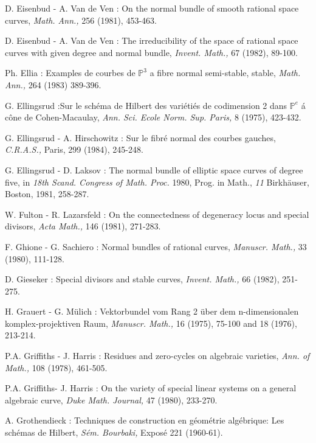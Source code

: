 \begin{thebibliography}{}
 D. Eisenbud - A. Van de Ven : On the normal bundle of smooth rational space curves, {\em Math. Ann.,} 256 (1981), 453-463.

 D. Eisenbud - A. Van de Ven : The irreducibility of the space of rational space curves with given degree and normal bundle, {\em Invent. Math.,} 67 (1982), 89-100.

 Ph. Ellia : Examples de courbes de $\mathbb{P}^{3}$ a fibre normal semi-stable, stable, {\em Math. Ann.,} 264 (1983) 389-396.

 G. Ellingsrud :\pageoriginale Sur le sch\'ema de Hilbert des vari\'eti\'es de codimension 2 dans $\mathbb{P}^{e}$ \'a c\^one de Cohen-Macaulay, {\em Ann. Sci. Ecole Norm. Sup. Paris,} 8 (1975), 423-432.

 G. Ellingsrud - A. Hirschowitz : Sur le fibr\'e normal des courbes gauches, {\em C.R.A.S.,} Paris, 299 (1984), 245-248.

 G. Ellingsrud - D. Laksov : The normal bundle of elliptic space curves of degree five, in  {\em 18th Scand. Congress of Math. Proc.} 1980, Prog. in Math., {\em 11} Birkh\"auser, Boston, 1981, 258-287.

 W. Fulton - R. Lazarsfeld : On the connectedness of degeneracy locus and special divisors, {\em Acta Math.,} 146 (1981), 271-283.

 F. Ghione - G. Sachiero : Normal bundles of rational curves, {\em Manuscr. Math.,} 33 (1980), 111-128.

 D. Gieseker : Special divisors and stable curves, {\em Invent. Math.,} 66 (1982), 251-275.

 H. Grauert - G. M\"ulich : Vektorbundel vom Rang 2 \"uber dem n-dimensionalen komplex-projektiven Raum, {\em Manuscr. Math.,} 16 (1975), 75-100 and 18 (1976), 213-214.

  P.A. Griffiths - J. Harris : Residues and zero-cycles on algebraic varieties, {\em Ann. of Math.,} 108 (1978), 461-505.

 P.A. Griffiths\pageoriginale - J. Harris : On the variety of special linear systems on a general algebraic curve, {\em Duke Math. Journal,} 47 (1980), 233-270.

 A. Grothendieck : Techniques de construction en g\'eom\'etrie alg\'ebrique: Les sch\'emas de Hilbert, {\em S\'em. Bourbaki,} Expos\'e 221 (1960-61). 


\end{thebibliography}
